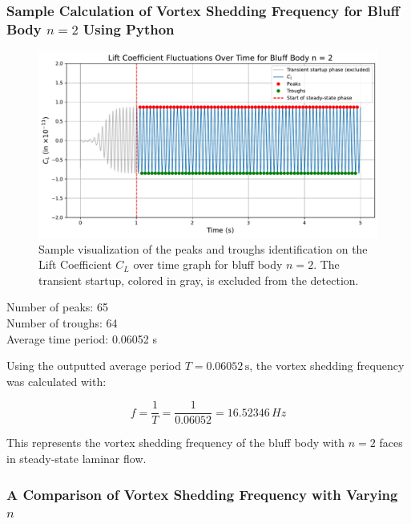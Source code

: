 \subsubsection{Sample Calculation of Vortex Shedding Frequency for Bluff Body $n=2$ Using Python}

\begin{figure}[H]
	\centering
	\includegraphics[width=\textwidth]{images/2face_graph_sample_Calc}
	\caption{Sample visualization of the peaks and troughs identification on the Lift Coefficient $C_L$ over time graph for bluff body $n=2$. The transient startup, colored in gray, is excluded from the detection.}
	\label{fig:2FaceGraphSampleCalc} 
\end{figure}

\begin{tcolorbox}[title=Python Output,fonttitle=\bfseries,
	colframe=black!75!white,colback=gray!10!white,boxrule=0.5pt,
	fontupper=\ttfamily]
	Number of peaks:    65 \\
	Number of troughs:  64 \\
	
	Average time period: 0.06052 s \\
\end{tcolorbox}

Using the outputted average period \( T = 0.06052 \, \text{s} \), the vortex shedding frequency was calculated with:

\[
f = \frac{1}{T} = \frac{1}{0.06052} = 16.52346 \, Hz
\]

This represents the vortex shedding frequency of the bluff body with \( n = 2 \) faces in steady-state laminar flow.

\subsubsection{A Comparison of Vortex Shedding Frequency with Varying $n$}

